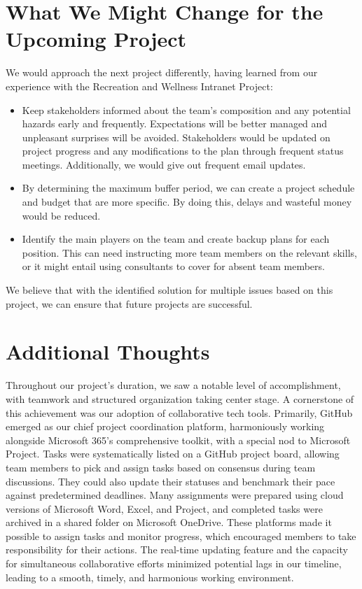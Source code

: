 \section{What We Might Change for the Upcoming Project}

We would approach the next project differently, having learned from our experience with the Recreation and Wellness Intranet Project:

\begin{itemize}
    \item Keep stakeholders informed about the team's composition and any potential hazards early and frequently. Expectations will be better managed and unpleasant surprises will be avoided. Stakeholders would be updated on project progress and any modifications to the plan through frequent status meetings. Additionally, we would give out frequent email updates.
    \item By determining the maximum buffer period, we can create a project schedule and budget that are more specific. By doing this, delays and wasteful money would be reduced.
    \item Identify the main players on the team and create backup plans for each position. This can need instructing more team members on the relevant skills, or it might entail using consultants to cover for absent team members.
\end{itemize}

We believe that with the identified solution for multiple issues based on this project, we can ensure that future projects are successful.

\section{Additional Thoughts}

Throughout our project's duration, we saw a notable level of accomplishment, with teamwork and structured organization taking center stage. A cornerstone of this achievement was our adoption of collaborative tech tools. Primarily, GitHub emerged as our chief project coordination platform, harmoniously working alongside Microsoft 365's comprehensive toolkit, with a special nod to Microsoft Project. Tasks were systematically listed on a GitHub project board, allowing team members to pick and assign tasks based on consensus during team discussions. They could also update their statuses and benchmark their pace against predetermined deadlines. Many assignments were prepared using cloud versions of Microsoft Word, Excel, and Project, and completed tasks were archived in a shared folder on Microsoft OneDrive. These platforms made it possible to assign tasks and monitor progress, which encouraged members to take responsibility for their actions. The real-time updating feature and the capacity for simultaneous collaborative efforts minimized potential lags in our timeline, leading to a smooth, timely, and harmonious working environment.

